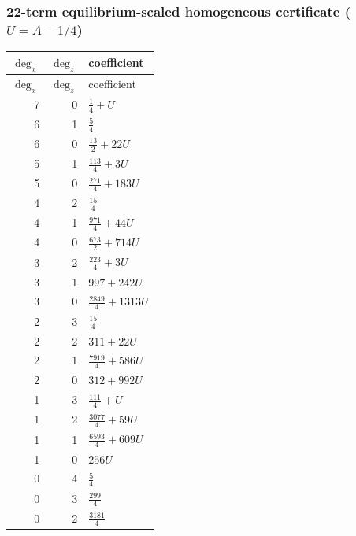 \subsubsection*{22-term equilibrium-scaled homogeneous certificate ($U=A-1/4$)}
\begin{longtable}{rrl}
$\deg_{x}$ & $\deg_{z}$ & coefficient\\
\toprule
\endfirsthead
$\deg_{x}$ & $\deg_{z}$ & coefficient\\
\toprule
\endhead
7 & 0 & $\frac{1}{4}+U$\\
6 & 1 & $\frac{5}{4}$\\
6 & 0 & $\frac{13}{2}+22U$\\
5 & 1 & $\frac{113}{4}+3U$\\
5 & 0 & $\frac{271}{4}+183U$\\
4 & 2 & $\frac{15}{4}$\\
4 & 1 & $\frac{971}{4}+44U$\\
4 & 0 & $\frac{673}{2}+714U$\\
3 & 2 & $\frac{223}{4}+3U$\\
3 & 1 & $997+242U$\\
3 & 0 & $\frac{2849}{4}+1313U$\\
2 & 3 & $\frac{15}{4}$\\
2 & 2 & $311+22U$\\
2 & 1 & $\frac{7919}{4}+586U$\\
2 & 0 & $312+992U$\\
1 & 3 & $\frac{111}{4}+U$\\
1 & 2 & $\frac{3077}{4}+59U$\\
1 & 1 & $\frac{6593}{4}+609U$\\
1 & 0 & $256U$\\
0 & 4 & $\frac{5}{4}$\\
0 & 3 & $\frac{299}{4}$\\
0 & 2 & $\frac{3181}{4}$\\
\bottomrule
\end{longtable}

